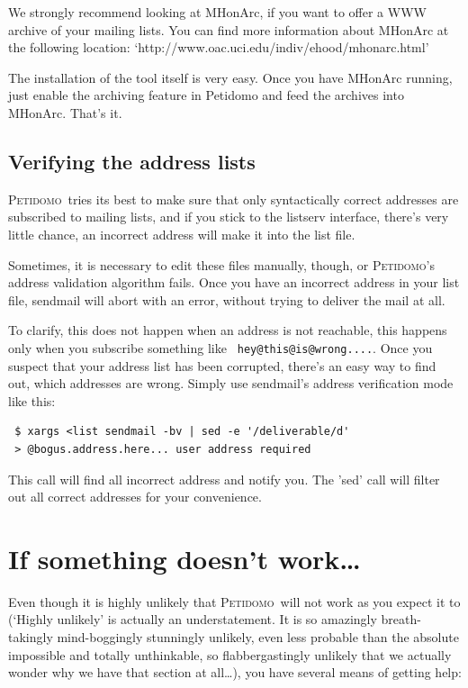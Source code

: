 \documentclass[a4paper,10pt]{scrreprt}
\newcommand{\Petidomo}{{\scshape Peti\-domo}}
\newcommand{\file}[1]{{\sf #1}}
\begin{document}
We strongly recommend looking at MHonArc, if you want to offer a WWW
archive of your mailing lists. You can find more information about
MHonArc at the following location:
`http://www.oac.uci.edu/indiv/ehood/mhonarc.html'

The installation of the tool itself is very easy. Once you have
MHonArc running, just enable the archiving feature in Petidomo and
feed the archives into MHonArc. That's it.

\section{Verifying the address lists}

\Petidomo\ tries its best to make sure that only syntactically correct
addresses are subscribed to mailing lists, and if you stick to the
listserv interface, there's very little chance, an incorrect address
will make it into the \file{list} file.

Sometimes, it is necessary to edit these files manually, though, or
\Petidomo's address validation algorithm fails. Once you have an
incorrect address in your list file, sendmail will abort with an
error, without trying to deliver the mail at all.

To clarify, this does not happen when an address is not reachable,
this happens only when you subscribe something like {\tt
hey@this@is@wrong....}. Once you suspect that your address list has
been corrupted, there's an easy way to find out, which addresses are
wrong. Simply use sendmail's address verification mode like this:

\begin{verbatim}
 $ xargs <list sendmail -bv | sed -e '/deliverable/d'
 > @bogus.address.here... user address required
\end{verbatim}

This call will find all incorrect address and notify you. The 'sed'
call will filter out all correct addresses for your convenience.

\chapter{If something doesn't work\dots{}}

Even though it is highly unlikely that \Petidomo\ will not
work as you expect it to (`Highly unlikely' is actually an
understatement. It is so amazingly breath-takingly mind-boggingly
stunningly unlikely, even less probable than the absolute impossible
and totally unthinkable, so flabbergastingly unlikely that we actually
wonder why we have that section at all\dots{}), you have several means
of getting help:
\end{document}
